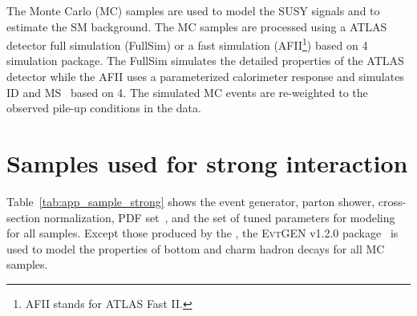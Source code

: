 The Monte Carlo (MC) samples are used to model the SUSY signals and to estimate the SM background.
The MC samples are processed using a ATLAS detector full simulation (FullSim) or a fast simulation (AFII\footnote{AFII stands for ATLAS Fast II.}) based on {\GEANT}4~\cite{Agostinelli:2002hh} simulation package.
The FullSim simulates the detailed properties of the ATLAS detector while the AFII uses a parameterized calorimeter response and simulates ID and MS~\cite{ATLAS:2010bfa} based on {\GEANT}4.
The simulated MC events are re-weighted to the observed pile-up conditions in the data.


\section{Samples used for strong interaction}
\label{sec:app_samples_strong}






Table~\ref{tab:app_sample_strong} shows the event generator, parton shower, cross-section normalization, PDF set~\cite{Martin:2009iq}, and the set of tuned parameters for modeling for all samples.
Except those produced by the {\SHERPA}, the \textsc{EvtGEN}\xspace v1.2.0 package~\cite{Lange:2001uf} is used to model the properties of bottom and charm hadron decays for all MC samples.

